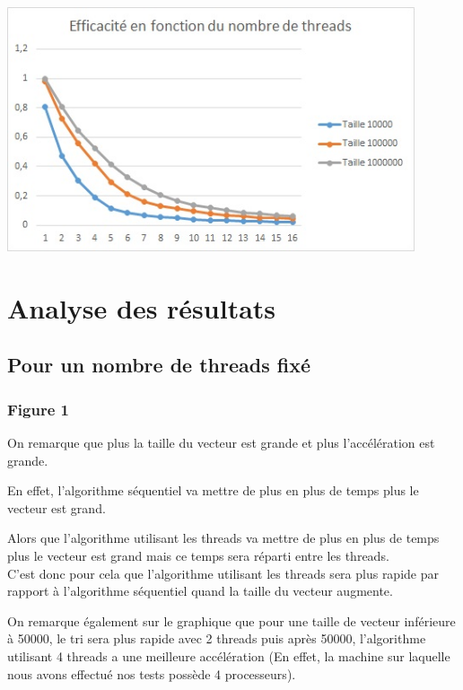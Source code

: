 \documentclass{article}
\begin{document}
\begin{center}
\includegraphics[width=12cm]{EfficaciteThreads.jpg}
\end{center}

\section{Analyse des résultats}

\subsection*{Pour un nombre de threads fixé}

\subsubsection*{Figure 1}
On remarque que plus la taille du vecteur est grande et plus l'accélération est grande.

En effet, l'algorithme séquentiel va mettre de plus en plus de temps plus le vecteur est grand.

Alors que l'algorithme utilisant les threads va mettre de plus en plus de temps plus le vecteur est grand mais ce temps sera réparti entre les threads.\\

C'est donc pour cela que l'algorithme utilisant les threads sera plus rapide par rapport à l'algorithme séquentiel quand la taille du vecteur augmente.

On remarque également sur le graphique que pour une taille de vecteur inférieure à 50000, le tri sera plus rapide avec 2 threads puis après 50000, l'algorithme utilisant 4 threads a une meilleure accélération (En effet, la machine sur laquelle nous avons effectué nos tests possède 4 processeurs).\\
\end{document}
